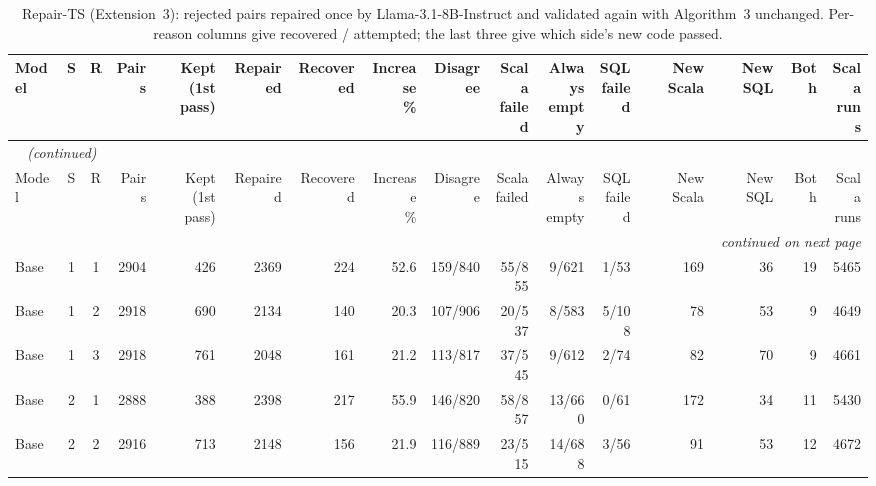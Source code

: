 \begin{landscape}
{\footnotesize
{}
\setlength{\tabcolsep}{4.2pt}
\begin{longtable}{@{}lccrrrrrrrrrrrrr@{}}
\caption{Repair-TS (Extension~3): rejected pairs repaired once by Llama-3.1-8B-Instruct and validated again with Algorithm~3 unchanged. Per-reason columns give recovered / attempted; the last three give which side's new code passed.}\label{tab:gen-repair}\\
\toprule
\rowcolor{headshade}Model & S & R & Pairs & \makecell{Kept\\(1st pass)} & Repaired & Recovered & \makecell{Increase\\\%} & Disagree & \makecell{Scala\\failed} & \makecell{Always\\empty} & \makecell{SQL\\failed} & New Scala & New SQL & Both & \makecell{Scala\\runs}\\
\midrule
\endfirsthead
\multicolumn{16}{l}{\textit{\tablename~\thetable{} (continued)}}\\
\toprule
\rowcolor{headshade}Model & S & R & Pairs & \makecell{Kept\\(1st pass)} & Repaired & Recovered & \makecell{Increase\\\%} & Disagree & \makecell{Scala\\failed} & \makecell{Always\\empty} & \makecell{SQL\\failed} & New Scala & New SQL & Both & \makecell{Scala\\runs}\\
\midrule
\endhead
\midrule
\multicolumn{16}{r}{\textit{continued on next page}}\\
\endfoot
\bottomrule
\endlastfoot
Base & 1 & 1 & 2904 & 426 & 2369 & 224 & 52.6 & 159/840 & 55/855 & 9/621 & 1/53 & 169 & 36 & 19 & 5465\\
Base & 1 & 2 & 2918 & 690 & 2134 & 140 & 20.3 & 107/906 & 20/537 & 8/583 & 5/108 & 78 & 53 & 9 & 4649\\
Base & 1 & 3 & 2918 & 761 & 2048 & 161 & 21.2 & 113/817 & 37/545 & 9/612 & 2/74 & 82 & 70 & 9 & 4661\\
Base & 2 & 1 & 2888 & 388 & 2398 & 217 & 55.9 & 146/820 & 58/857 & 13/660 & 0/61 & 172 & 34 & 11 & 5430\\
Base & 2 & 2 & 2916 & 713 & 2148 & 156 & 21.9 & 116/889 & 23/515 & 14/688 & 3/56 & 91 & 53 & 12 & 4672\\

\end{longtable}}
\end{landscape}
